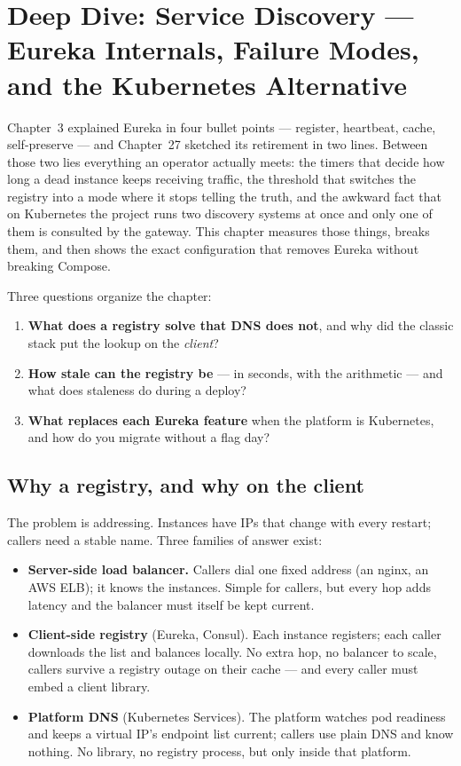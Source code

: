 \chapter{Deep Dive: Service Discovery --- Eureka Internals, Failure Modes, and the Kubernetes Alternative}
\label{ch:dd-discovery}

Chapter~3 explained Eureka in four bullet points --- register, heartbeat,
cache, self-preserve --- and Chapter~27 sketched its retirement in two
lines. Between those two lies everything an operator actually meets: the
timers that decide how long a dead instance keeps receiving traffic, the
threshold that switches the registry into a mode where it stops telling
the truth, and the awkward fact that on Kubernetes the project runs two
discovery systems at once and only one of them is consulted by the
gateway. This chapter measures those things, breaks them, and then shows
the exact configuration that removes Eureka without breaking Compose.

Three questions organize the chapter:

\begin{enumerate}
  \item \textbf{What does a registry solve that DNS does not}, and why
  did the classic stack put the lookup on the \emph{client}?
  \item \textbf{How stale can the registry be} --- in seconds, with the
  arithmetic --- and what does staleness do during a deploy?
  \item \textbf{What replaces each Eureka feature} when the platform is
  Kubernetes, and how do you migrate without a flag day?
\end{enumerate}

\section{Why a registry, and why on the client}

The problem is addressing. Instances have IPs that change with every
restart; callers need a stable name. Three families of answer exist:

\begin{itemize}
  \item \textbf{Server-side load balancer.} Callers dial one fixed
  address (an nginx, an AWS ELB); it knows the instances. Simple for
  callers, but every hop adds latency and the balancer must itself be
  kept current.
  \item \textbf{Client-side registry} (Eureka, Consul). Each instance
  registers; each caller downloads the list and balances locally. No
  extra hop, no balancer to scale, callers survive a registry outage on
  their cache --- and every caller must embed a client library.
  \item \textbf{Platform DNS} (Kubernetes Services). The platform
  watches pod readiness and keeps a virtual IP's endpoint list current;
  callers use plain DNS and know nothing. No library, no registry
  process, but only inside that platform.
\end{itemize}

